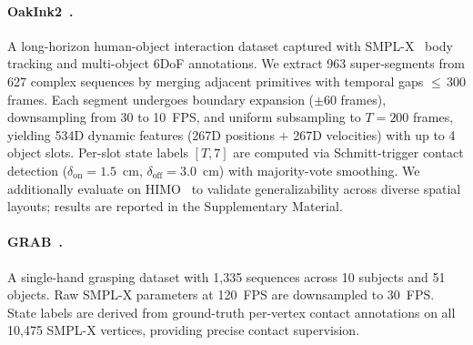 \documentclass[sigconf, screen, review, anonymous]{acmart}
\begin{document}
\paragraph{OakInk2~\cite{zhan2024oakink2}.}
A long-horizon human-object interaction dataset captured with SMPL-X~\cite{pavlakos2019expressive} body tracking and multi-object 6DoF annotations.
We extract 963 super-segments from 627 complex sequences by merging adjacent primitives with temporal gaps ${\leq}\,300$ frames.
Each segment undergoes boundary expansion (${\pm}60$ frames), downsampling from 30 to 10~FPS, and uniform subsampling to $T{=}200$ frames, yielding 534D dynamic features (267D positions $+$ 267D velocities) with up to 4 object slots.
Per-slot state labels $[T, 7]$ are computed via Schmitt-trigger contact detection ($\delta_\text{on}{=}1.5$~cm, $\delta_\text{off}{=}3.0$~cm) with majority-vote smoothing. We additionally evaluate on HIMO~\cite{himo2024} to validate generalizability across diverse spatial layouts; results are reported in the Supplementary Material.
\paragraph{GRAB~\cite{taheri2020grab}.}
A single-hand grasping dataset with 1{,}335 sequences across 10 subjects and 51 objects.
Raw SMPL-X parameters at 120~FPS are downsampled to 30~FPS.
State labels are derived from ground-truth per-vertex contact annotations on all 10{,}475 SMPL-X vertices, providing precise contact supervision.
\end{document}
